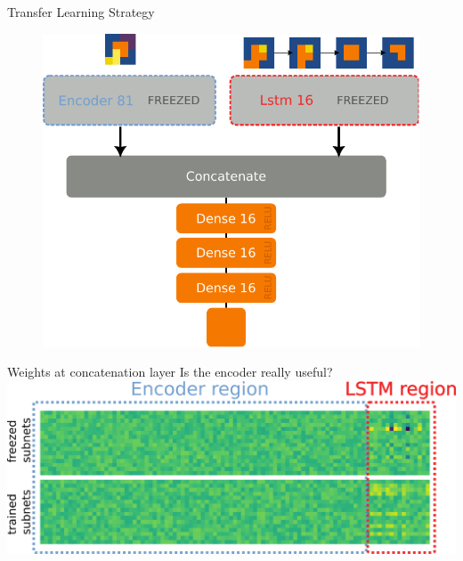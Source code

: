 \documentclass{beamer}
\begin{document}


\begin{frame}{Transfer Learning Strategy}
    \begin{figure}
        \centering
        \includegraphics[width=.7\linewidth]{figures/freezetraining_2.pdf}
    \end{figure}
\end{frame}


\begin{frame}{Weights at concatenation layer}
    Is the encoder really useful?
    \vfill
    \includegraphics[width=\linewidth]{figures/weights_comparison.png}
\end{frame}
\end{document}
